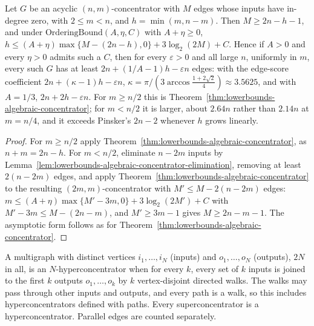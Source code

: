 \begin{theorem}
  \label{thm:lowerbounds-algebraic-acyclic-concentrator}
  \leanok
  Let $G$ be an acyclic $(n,m)$-concentrator with $M$ edges whose inputs have in-degree zero,
  with $2\le m<n$, and $h=\min(m,n-m)$. Then $M\ge2n-h-1$, and under
  $\mathrm{OrderingBound}(A,\eta,C)$ with $A+\eta\ge0$,
  $h\le(A+\eta)\max\{M-(2n-h),0\}+3\log_2(2M)+C$. Hence if $A>0$ and every $\eta>0$ admits such
  a $C$, then for every $\varepsilon>0$ and all large $n$, uniformly in $m$, every such $G$ has
  at least $2n+(1/A-1)h-\varepsilon n$ edges: with the edge-score coefficient
  $2n+(\kappa-1)h-\varepsilon n$, $\kappa=\pi/(3\arccos\tfrac{1+2\sqrt2}{4})\approx3.5625$, and
  with $A=1/3$, $2n+2h-\varepsilon n$. For $m\ge n/2$ this is
  Theorem~\ref{thm:lowerbounds-algebraic-concentrator}; for $m<n/2$ it is larger, about $2.64n$
  rather than $2.14n$ at $m=n/4$, and it exceeds Pinsker's $2n-2$ whenever $h$ grows linearly.
\end{theorem}
\begin{proof}
  \leanok
  For $m\ge n/2$ apply Theorem~\ref{thm:lowerbounds-algebraic-concentrator}, as
  $n+m=2n-h$. For $m<n/2$, eliminate $n-2m$ inputs by
  Lemma~\ref{lem:lowerbounds-algebraic-concentrator-elimination}, removing at least $2(n-2m)$
  edges, and apply Theorem~\ref{thm:lowerbounds-algebraic-concentrator} to the resulting
  $(2m,m)$-concentrator with $M'\le M-2(n-2m)$ edges: $m\le(A+\eta)\max\{M'-3m,0\}+3\log_2(2M')+C$
  with $M'-3m\le M-(2n-m)$, and $M'\ge3m-1$ gives $M\ge2n-m-1$. The asymptotic form follows as
  for Theorem~\ref{thm:lowerbounds-algebraic-concentrator}.
\end{proof}

\begin{definition}[Hyperconcentrator]
  \label{def:lowerbounds-algebraic-hyperconcentrator}
  \leanok
  A multigraph with distinct vertices $i_1,\dots,i_N$ (inputs) and $o_1,\dots,o_N$ (outputs),
  $2N$ in all, is an $N$-hyperconcentrator when for every $k$, every set of $k$ inputs is joined
  to the first $k$ outputs $o_1,\dots,o_k$ by $k$ vertex-disjoint directed walks. The walks may
  pass through other inputs and outputs, and every path is a walk, so this includes
  hyperconcentrators defined with paths. Every superconcentrator is a hyperconcentrator.
  Parallel edges are counted separately.
\end{definition}

